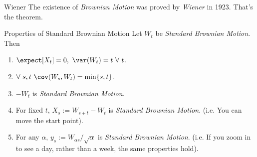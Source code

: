 \documentclass[11pt,a4paper]{article}
\begin{document}
  \begin{theorem}{Wiener}
    The existence of \textit{Brownian Motion} was proved by \textit{Wiener} in 1923. That's the theorem.
  \end{theorem}

  \begin{proposition}{Properties of Standard Brownian Motion}\label{pro_properties_of_standard_brownian_motion}
    Let $W_t$ be \textit{Standard Brownian Motion}. Then
    \begin{enumerate}
      \item $\expect[X_t]=0,\ \var(W_t)=t\ \forall\ t$.
      \item $\forall\ s,t\ \cov(W_s,W_t)=\min\{s,t\}$.
      \item $-W_t$ is \textit{Standard Brownian Motion}.
      \item For fixed $t$, $X_s:=W_{s+t}-W_t$ is \textit{Standard Brownian Motion}. (i.e. You can move the start point).
      \item For any $\alpha$, $y_s:=W_{\alpha s}/\sqrt\alpha$ is \textit{Standard Brownian Motion}. (i.e. If you zoom in to see a day, rather than a week, the same properties hold).
    \end{enumerate}
  \end{proposition}
\end{document}
